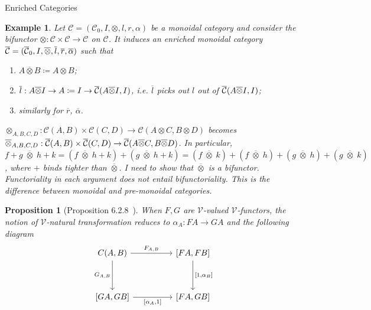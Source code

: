 \documentclass[acmsmall, screen, nonacm]{acmart}
\newtheorem{example}[theorem]{Example}
\newtheorem{proposition}[theorem]{Proposition}
\newcommand\question[1]{{\color{azure}#1}}
\begin{document}
\begin{section}{Enriched Categories}
\begin{example}
  Let $\mathcal{C} = (\mathcal{C}_{0},I,\otimes, l, r, \alpha)$ be a monoidal category and consider the bifunctor $\otimes : \mathcal{C} \times \mathcal{C} \to \mathcal{C}$ on $\mathcal{C}$.
  It induces an enriched monoidal category ${\overline{\mathcal{C}}} = ({\overline{\mathcal{C}}}_{0}, I, {\overline{\mathcal{\otimes}}}, \overline{l}, \overline{r}, {\overline{\mathcal{\alpha}}})$ such that
  \begin{enumerate}
    \item $A \overline{\otimes} B \coloneq A \otimes B$;
    \item $\overline{l} : A \overline{\otimes} I \to A \coloneq I \to {\overline{\mathcal{C}}}(A \overline{\otimes} I, I)$, i.e. $\overline{l}$ picks out $l$ out of ${\overline{\mathcal{C}}}(A \overline{\otimes} I, I)$;
    \item similarly for $\overline{r}$, $\overline{\alpha}$.
  \end{enumerate}
  $\otimes_{A,B,C,D} : \mathcal{C}(A,B) \times \mathcal{C}(C,D) \to \mathcal{C}(A \otimes C, B \otimes D)$ becomes $\overline{\otimes}_{A,B,C,D} : {\overline{\mathcal{C}}}(A,B) \times {\overline{\mathcal{C}}}(C,D) \to {\overline{\mathcal{C}}}(A \overline{\otimes} C, B \overline{\otimes} D)$.
  In particular, $f + g \;\overline{\otimes}\; h + k = (f \;\overline{\otimes}\; h + k) + (g \;\overline{\otimes}\; h + k) = (f \;\overline{\otimes}\; k) + (f \;\overline{\otimes}\; h) + (g \;\overline{\otimes}\; h) + (g \;\overline{\otimes}\; k)$, where $+$ binds tighter than $\overline{\otimes}$.
  \question{I need to show that $\overline{\otimes}$ is a bifunctor. Functoriality in each argument does not entail bifunctoriality. This is the difference between monoidal and pre-monoidal categories.
  }
\end{example}

\begin{proposition}[Proposition 6.2.8~\cite{Borceux_1994}]
  When $F,G$ are $\mathcal{V}$-valued $\mathcal{V}$-functors, the notion of $\mathcal{V}$-natural transformation reduces to
  $\alpha_{A} : FA \to GA$ and the following diagram
  \[\begin{tikzcd}
	{C(A,B)} && {[FA,FB]} \\
	\\
	{[GA,GB]} && {[FA,GB]}
	\arrow["{F_{A,B}}", from=1-1, to=1-3]
	\arrow["{G_{A,B}}"', from=1-1, to=3-1]
	\arrow["{[1,\alpha_{B}]}", from=1-3, to=3-3]
	\arrow["{[\alpha_{A},1]}"', from=3-1, to=3-3]
\end{tikzcd}\]
\end{proposition}


\end{section}
\end{document}
